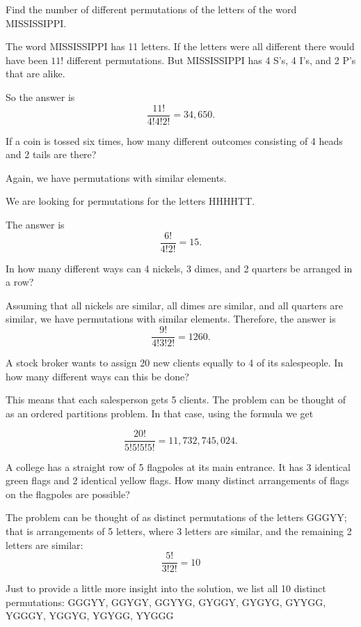 \begin{example}
    Find the number of different permutations of the letters of the word MISSISSIPPI.
\end{example}
\begin{solution}
    The word MISSISSIPPI has 11 letters. If the letters were all different there would have been \(11!\) different permutations. But MISSISSIPPI has 4 S's, 4 I's, and 2 P's that are alike.

    So the answer is \[\frac{11!}{4!4!2!} = 34,650.\]
\end{solution}

\begin{example}
    If a coin is tossed six times, how many different outcomes consisting of 4 heads and 2 tails are there?
\end{example}
\begin{solution}
    Again, we have permutations with similar elements.

    We are looking for permutations for the letters HHHHTT.

    The answer is \[\frac{6!}{4!2!} = 15.\]
\end{solution}

\begin{example}
    In how many different ways can 4 nickels, 3 dimes, and 2 quarters be arranged in a row?
\end{example}
\begin{solution}
    Assuming that all nickels are similar, all dimes are similar, and all quarters are similar, we have permutations with similar elements. Therefore, the answer is \[\frac{9!}{4!3!2!} = 1260.\]
\end{solution}

\begin{example}
    A stock broker wants to assign 20 new clients equally to 4 of its salespeople. In how many different ways can this be done?
\end{example}
\begin{solution}
    This means that each salesperson gets 5 clients. The problem can be thought of as an ordered partitions problem. In that case, using the formula we get

    \[\frac{20!}{5!5!5!5!} = 11,732,745,024.\]
\end{solution}

\begin{example}
    A college has a straight row of 5 flagpoles at its main entrance. It has 3 identical green flags and 2 identical yellow flags. How many distinct arrangements of flags on the flagpoles are possible?
\end{example}
\begin{solution}
    The problem can be thought of as distinct permutations of the letters GGGYY; that is arrangements of 5 letters, where 3 letters are similar, and the remaining 2 letters are similar:
    \[\frac{5!}{3!2!} = 10\]

    Just to provide a little more insight into the solution, we list all 10 distinct permutations:
    GGGYY, GGYGY, GGYYG, GYGGY, GYGYG, GYYGG, YGGGY, YGGYG, YGYGG, YYGGG
\end{solution}
